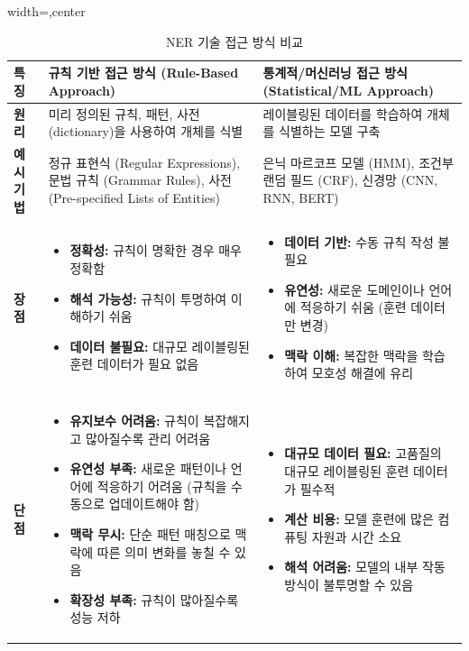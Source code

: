 \documentclass[11pt,a4paper]{article}
\theoremstyle{definition}
\begin{document}
\begin{table}[h!]
\caption{NER 기술 접근 방식 비교}
\label{tab:ner_approaches}
\centering
\begin{adjustbox}{width=\textwidth,center}
\begin{tabular}{p{}p{}p{}}
\toprule
\textbf{특징} & \textbf{규칙 기반 접근 방식 (Rule-Based Approach)} & \textbf{통계적/머신러닝 접근 방식 (Statistical/ML Approach)} \\
\midrule
\textbf{원리} & 미리 정의된 규칙, 패턴, 사전(dictionary)을 사용하여 개체를 식별 & 레이블링된 데이터를 학습하여 개체를 식별하는 모델 구축 \\
\textbf{예시 기법} & 정규 표현식 (Regular Expressions), 문법 규칙 (Grammar Rules), 사전 (Pre-specified Lists of Entities) & 은닉 마르코프 모델 (HMM), 조건부 랜덤 필드 (CRF), 신경망 (CNN, RNN, BERT) \\
\textbf{장점} & \begin{itemize}
    \item \textbf{정확성:} 규칙이 명확한 경우 매우 정확함
    \item \textbf{해석 가능성:} 규칙이 투명하여 이해하기 쉬움
    \item \textbf{데이터 불필요:} 대규모 레이블링된 훈련 데이터가 필요 없음
\end{itemize} & \begin{itemize}
    \item \textbf{데이터 기반:} 수동 규칙 작성 불필요
    \item \textbf{유연성:} 새로운 도메인이나 언어에 적응하기 쉬움 (훈련 데이터만 변경)
    \item \textbf{맥락 이해:} 복잡한 맥락을 학습하여 모호성 해결에 유리
\end{itemize} \\
\textbf{단점} & \begin{itemize}
    \item \textbf{유지보수 어려움:} 규칙이 복잡해지고 많아질수록 관리 어려움
    \item \textbf{유연성 부족:} 새로운 패턴이나 언어에 적응하기 어려움 (규칙을 수동으로 업데이트해야 함)
    \item \textbf{맥락 무시:} 단순 패턴 매칭으로 맥락에 따른 의미 변화를 놓칠 수 있음
    \item \textbf{확장성 부족:} 규칙이 많아질수록 성능 저하
\end{itemize} & \begin{itemize}
    \item \textbf{대규모 데이터 필요:} 고품질의 대규모 레이블링된 훈련 데이터가 필수적
    \item \textbf{계산 비용:} 모델 훈련에 많은 컴퓨팅 자원과 시간 소요
    \item \textbf{해석 어려움:} 모델의 내부 작동 방식이 불투명할 수 있음
\end{itemize} \\
\bottomrule
\end{tabular}
\end{adjustbox}
\end{table}
\end{document}
